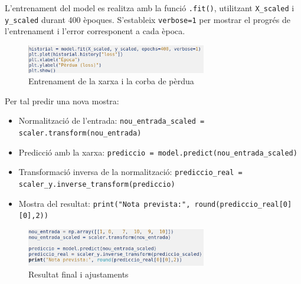 L’entrenament del model es realitza amb la funció \texttt{.fit()}, utilitzant \texttt{X\_scaled} i \texttt{y\_scaled} durant 400 èpoques. S’estableix \texttt{verbose=1} per mostrar el progrés de l’entrenament i l’error corresponent a cada època.
\begin{figure}[H]
\centering
\includegraphics[width=0.7\textwidth]{./figures/28.png}
\caption{Entrenament de la xarxa i la corba de pèrdua}
\end{figure}

Per tal predir una nova mostra:
\begin{itemize}
\item Normalització de l’entrada: \texttt{nou\_entrada\_scaled = scaler.transform(nou\_entrada)}
\item Predicció amb la xarxa: \texttt{prediccio = model.predict(nou\_entrada\_scaled)}
\item Transformació inversa de la normalització: \texttt{prediccio\_real = scaler\_y.inverse\_transform(prediccio)}
\item Mostra del resultat: \texttt{print("Nota prevista:", round(prediccio\_real[0][0],2))}
\end{itemize}

\begin{figure}[h!]
\centering
\includegraphics[width=0.7\textwidth]{./figures/29.png}
\caption{Resultat final i ajustaments}
\end{figure}


